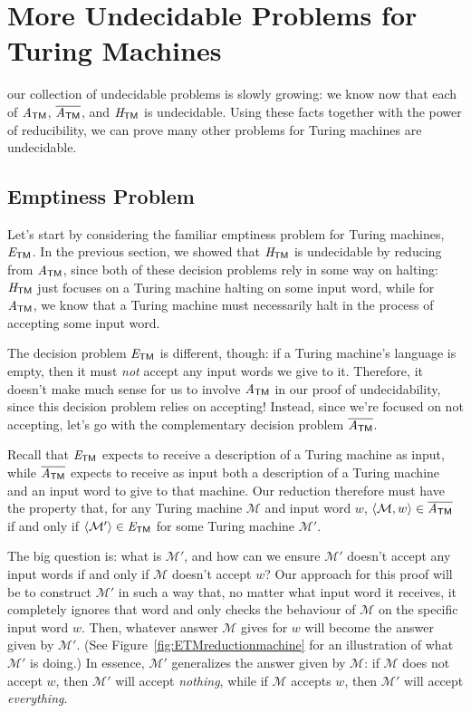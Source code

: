 \section{More Undecidable Problems for Turing Machines}\label{sec:moreundecidableTM}

 our collection of undecidable problems is slowly growing: we know now that each of $\mathit{A}_{\textsf{TM}}$, $\overline{\mathit{A}_{\textsf{TM}}}$, and $\mathit{H}_{\textsf{TM}}$ is undecidable. Using these facts together with the power of reducibility, we can prove many other problems for Turing machines are undecidable.

\subsection*{Emptiness Problem}

Let's start by considering the familiar emptiness problem for Turing machines, $\mathit{E}_{\textsf{TM}}$. In the previous section, we showed that $\mathit{H}_{\textsf{TM}}$ is undecidable by reducing from $\mathit{A}_{\textsf{TM}}$, since both of these decision problems rely in some way on halting: $\mathit{H}_{\textsf{TM}}$ just focuses on a Turing machine halting on some input word, while for $\mathit{A}_{\textsf{TM}}$, we know that a Turing machine must necessarily halt in the process of accepting some input word.

The decision problem $\mathit{E}_{\textsf{TM}}$ is different, though: if a Turing machine's language is empty, then it must \emph{not} accept any input words we give to it. Therefore, it doesn't make much sense for us to involve $\mathit{A}_{\textsf{TM}}$ in our proof of undecidability, since this decision problem relies on accepting! Instead, since we're focused on not accepting, let's go with the complementary decision problem $\overline{\mathit{A}_{\textsf{TM}}}$.

Recall that $\mathit{E}_{\textsf{TM}}$ expects to receive a description of a Turing machine as input, while $\overline{\mathit{A}_{\textsf{TM}}}$ expects to receive as input both a description of a Turing machine and an input word to give to that machine. Our reduction therefore must have the property that, for any Turing machine $\mathcal{M}$ and input word $w$, $\langle \mathcal{M}, w \rangle \in \overline{\mathit{A}_{\textsf{TM}}}$ if and only if $\langle \mathcal{M}' \rangle \in \mathit{E}_{\textsf{TM}}$ for some Turing machine $\mathcal{M}'$.

The big question is: what is $\mathcal{M}'$, and how can we ensure $\mathcal{M}'$ doesn't accept any input words if and only if $\mathcal{M}$ doesn't accept $w$? Our approach for this proof will be to construct $\mathcal{M}'$ in such a way that, no matter what input word it receives, it completely ignores that word and only checks the behaviour of $\mathcal{M}$ on the specific input word $w$. Then, whatever answer $\mathcal{M}$ gives for $w$ will become the answer given by $\mathcal{M}'$. (See Figure~\ref{fig:ETMreductionmachine} for an illustration of what $\mathcal{M}'$ is doing.) In essence, $\mathcal{M}'$ generalizes the answer given by $\mathcal{M}$: if $\mathcal{M}$ does not accept $w$, then $\mathcal{M}'$ will accept \emph{nothing}, while if $\mathcal{M}$ accepts $w$, then $\mathcal{M}'$ will accept \emph{everything}.


